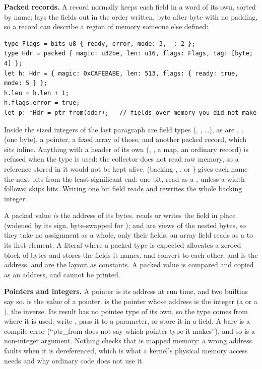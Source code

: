 \noindent\textbf{Packed records.} A record normally keeps each field in a
word of its own, sorted by name;  lays the fields out in the order
written, byte after byte with no padding, so a record can describe a region of
memory someone else defined:
\begin{verbatim}
type Flags = bits u8 { ready, error, mode: 3, _: 2 };
type Hdr = packed { magic: u32be, len: u16, flags: Flags, tag: [byte; 4] };
let h: Hdr = { magic: 0xCAFEBABE, len: 513, flags: { ready: true, mode: 5 } };
h.len = h.len + 1;
h.flags.error = true;
let p: *Hdr = ptr_from(addr);   // fields over memory you did not make
\end{verbatim}
\noindent Inside  the sized integers of the last paragraph are field
types (, , \ldots), as are , ,
 (one byte), a pointer, a fixed array \ic{[T; N]} of those, and another
packed record, which sits inline. Anything with a header of its own (,
\ic{[T]}, a map, an ordinary record) is refused when the type is used: the
collector does not read raw memory, so a reference stored in it would not be
kept alive.  (backing , ,
 or ) gives each name the next bits from the least significant
end: one bit, read as a , unless a width follows; \ic{\_} skips bits.
Writing one bit field reads and rewrites the whole backing integer.

\noindent A packed value \emph{is} the address of its bytes.  reads
or writes the field in place (widened by its sign, byte-swapped for );
 and  are views of the nested bytes, so they take no
assignment as a whole, only their fields; an array field reads as a  to its
first element. A literal  where a packed type is expected allocates
a zeroed block of  bytes and stores the fields it names.
 and  convert to each other, and  is the
address.  and  are the layout as constants.
A packed value is compared and copied as an address, and cannot be printed.

\noindent\textbf{Pointers and integers.} A pointer is its address at run
time, and two builtins say so.  is the  value of a
pointer.  is the pointer whose address is the integer
 (a  or a ), the inverse. Its result has no pointee
type of its own, so the type comes from where it is used: write
, pass it to a  parameter, or store it
in a  field. A bare  is a compile error
(``ptr\_from does not say which pointer type it makes''), and so is a
non-integer argument. Nothing checks that  is mapped memory: a wrong
address faults when it is dereferenced, which is what a kernel's physical
memory access needs and why ordinary code does not use it.

